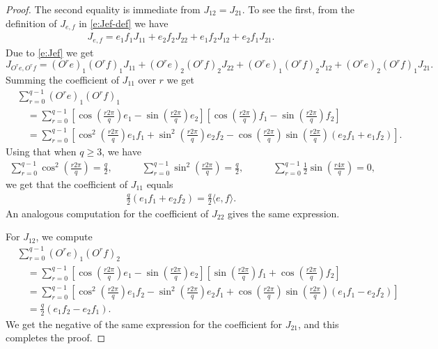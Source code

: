 \documentclass[11pt]{article}
\theoremstyle{remark}
\newcommand{\eqnst}[1]{\begin{equation*}#1\end{equation*}}
\newcommand{\eqnspl}[2]{\begin{equation}\begin{split}\label{#1}%
   #2\end{split}\end{equation}}
\newcommand{\eqnsplst}[1]{\begin{equation*}\begin{split}%
   #1\end{split}\end{equation*}}
\begin{document}
\begin{proof}
The second equality is immediate from $J_{12} = J_{21}$. To see the first,
from the definition of $J_{e,f}$ in \eqref{e:Jef-def} we have
\eqnspl{e:Jef}
{ J_{e, f} 
  = e_1 f_1 J_{11} + e_2 f_2 J_{22} + e_1 f_2 J_{12} + e_2 f_1 J_{21}. }
Due to \eqref{e:Jef} we get
\eqnst
{ J_{O^r e, O^r f}
  = (O^r e)_1 (O^r f)_1 J_{11} + (O^r e)_2 (O^r f)_2 J_{22} 
    + (O^r e)_1 (O^r f)_2 J_{12} + (O^r e)_2 (O^r f)_1 J_{21}. }
Summing the coefficient of $J_{11}$ over $r$ we get 
\eqnsplst{
 &\sum_{r=0}^{q-1} (O^r e)_1 (O^r f)_1 \\
 &\quad= \sum_{r=0}^{q-1} \left[ \cos \left( \frac{r 2 \pi}{q} \right) e_1 
   - \sin \left( \frac{r 2 \pi}{q} \right) e_2 \right]
   \left[ \cos \left( \frac{r 2 \pi}{q} \right) f_1 
   - \sin \left( \frac{r 2 \pi}{q} \right) f_2 \right] \\
 &\quad= \sum_{r=0}^{q-1} \left[ \cos^2 \left( \frac{r 2 \pi}{q}\right) e_1 f_1
   + \sin^2 \left( \frac{r 2 \pi}{q}\right) e_2 f_2 
   - \cos \left( \frac{r 2 \pi}{q} \right) \sin \left( \frac{r 2 \pi}{q} \right) (e_2 f_1 + e_1 f_2) \right]. }
Using that when $q \ge 3$, we have
\eqnsplst{
  \sum_{r=0}^{q-1} \cos^2 \left( \frac{r 2 \pi}{q}\right)
  = \frac{q}{2}, \qquad\quad
  \sum_{r=0}^{q-1} \sin^2 \left( \frac{r 2 \pi}{q}\right)
  = \frac{q}{2}, \qquad\quad
  \sum_{r=0}^{q-1} \frac{1}{2} \sin \left( \frac{r 4 \pi}{q}\right)
  = 0, }
we get that the coefficient of $J_{11}$ equals
\eqnsplst{
 \frac{q}{2} (e_1 f_1 + e_2 f_2) 
 = \frac{q}{2} \langle e,f \rangle. }
An analogous computation for the coefficient of $J_{22}$ gives the same expression.

For $J_{12}$, we compute 
\eqnsplst{
  &\sum_{r=0}^{q-1} (O^r e)_1 (O^r f)_2 \\
  &\quad = \sum_{r=0}^{q-1} \left[ \cos \left( \frac{r 2 \pi}{q} \right) e_1 
   - \sin \left( \frac{r 2 \pi}{q} \right) e_2 \right]
   \left[ \sin \left( \frac{r 2 \pi}{q} \right) f_1 
   + \cos \left( \frac{r 2 \pi}{q} \right) f_2 \right] \\
  &\quad= \sum_{r=0}^{q-1} \left[ \cos^2 \left( \frac{r 2 \pi}{q}\right) e_1 f_2
   - \sin^2 \left( \frac{r 2 \pi}{q}\right) e_2 f_1 
   + \cos \left( \frac{r 2 \pi}{q} \right) \sin \left( \frac{r 2 \pi}{q} \right) (e_1 f_1 - e_2 f_2) \right] \\
  &\quad= \frac{q}{2} (e_1 f_2 - e_2 f_1). }
We get the negative of the same expression for the coefficient for $J_{21}$, and this completes the proof.
\end{proof}
\end{document}
